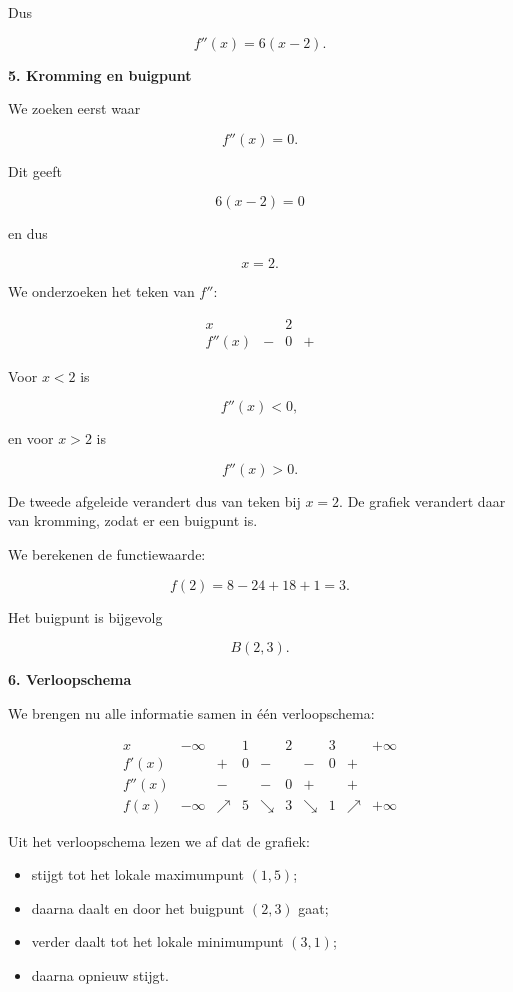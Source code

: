 \documentclass{ximera}
\begin{document}
\begin{oefening}{\oefU\ESS}
\begin{oplossing}
  Dus
  
  \[
  \boxed{f''(x)=6(x-2).}
  \]
  
  \textbf{5. Kromming en buigpunt}
  
  We zoeken eerst waar
  
  \[
  f''(x)=0.
  \]
  
  Dit geeft
  
  \[
  6(x-2)=0
  \]
  
  en dus
  
  \[
  x=2.
  \]
  
  We onderzoeken het teken van $f''$:
  
  \[
  \begin{array}{c|ccc}
  x
  & & 2 & \\ \hline
  f''(x)
  & - & 0 & +
  \end{array}
  \]
  
  Voor $x<2$ is
  
  \[
  f''(x)<0,
  \]
  
  en voor $x>2$ is
  
  \[
  f''(x)>0.
  \]
  
  De tweede afgeleide verandert dus van teken bij $x=2$.
  De grafiek verandert daar van kromming, zodat er een buigpunt is.
  
  We berekenen de functiewaarde:
  
  \[
  f(2)=8-24+18+1=3.
  \]
  
  Het buigpunt is bijgevolg
  
  \[
  \boxed{B(2,3).}
  \]
  
  \textbf{6. Verloopschema}
  
  We brengen nu alle informatie samen in één verloopschema:
  
  \[
  \begin{array}{c|ccccccccc}
  x
  & -\infty & & 1 & & 2 & & 3 & & +\infty
  \\ \hline
  f'(x)
  & & + & 0 & - & & - & 0 & + &
  \\
  f''(x)
  & & - & & - & 0 & + & & + &
  \\ \hline
  f(x)
  & -\infty
  & \nearrow
  & 5
  & \searrow
  & 3
  & \searrow
  & 1
  & \nearrow
  & +\infty
  \end{array}
  \]
  
  Uit het verloopschema lezen we af dat de grafiek:
  
  \begin{itemize}
      \item stijgt tot het lokale maximumpunt $(1,5)$;
      \item daarna daalt en door het buigpunt $(2,3)$ gaat;
      \item verder daalt tot het lokale minimumpunt $(3,1)$;
      \item daarna opnieuw stijgt.
  \end{itemize}
  

\end{oplossing}
\end{oefening}
\end{document}
